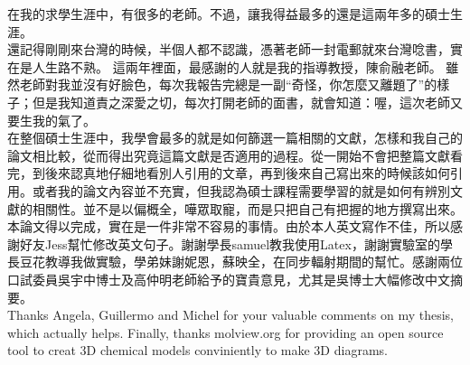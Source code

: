 \begin{acknowledgements} 

在我的求學生涯中，有很多的老師。不過，讓我得益最多的還是這兩年多的碩士生涯。\\

還記得剛剛來台灣的時候，半個人都不認識，憑著老師一封電郵就來台灣唸書，實在是人生路不熟。 這兩年裡面，最感謝的人就是我的指導教授，陳俞融老師。 雖然老師對我並沒有好臉色，每次我報告完總是一副“奇怪，你怎麼又離題了”的樣子；但是我知道責之深愛之切，每次打開老師的面書，就會知道：喔，這次老師又要生我的氣了。\\

在整個碩士生涯中，我學會最多的就是如何篩選一篇相關的文獻，怎樣和我自己的論文相比較，從而得出究竟這篇文獻是否適用的過程。從一開始不會把整篇文獻看完，到後來認真地仔細地看別人引用的文章，再到後來自己寫出來的時候該如何引用。或者我的論文內容並不充實，但我認為碩士課程需要學習的就是如何有辨別文獻的相關性。並不是以偏概全，嘩眾取寵，而是只把自己有把握的地方撰寫出來。\\

本論文得以完成，實在是一件非常不容易的事情。由於本人英文寫作不佳，所以感謝好友Jess幫忙修改英文句子。謝謝學長samuel教我使用Latex，謝謝實驗室的學長豆花教導我做實驗，學弟妹謝妮恩，蘇映全，在同步輻射期間的幫忙。感謝兩位口試委員吳宇中博士及高仲明老師給予的寶貴意見，尤其是吳博士大幅修改中文摘要。\\

Thanks Angela, Guillermo and Michel for your valuable comments on my thesis, which actually helps. Finally, thanks molview.org for providing an open source tool to creat 3D chemical models conviniently to make 3D diagrams.\\

\end{acknowledgements} 
